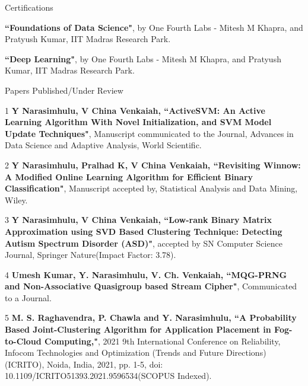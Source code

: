 \documentclass{resume} %
\begin{document}
\pagebreak

\begin{rSection}{Certifications}
	
	\begin{rSubsection}{}{}{}{}
		\item \textbf{``Foundations of Data Science"},  by One Fourth Labs - Mitesh M Khapra, and Pratyush Kumar, IIT Madras Research Park.
		\item \textbf{``Deep Learning"}, by One Fourth Labs - Mitesh M Khapra, and Pratyush Kumar, IIT Madras Research Park.
		
	\end{rSubsection}
	
\end{rSection}




\begin{rSection}{Papers Published/Under Review}
	
	\begin{rSubsection}{}{}{}{}
		
		\item[1] \textbf{Y Narasimhulu, V China Venkaiah, ``ActiveSVM: An Active Learning Algorithm With Novel Initialization, and SVM Model Update Techniques"}, Manuscript communicated to the Journal, Advances in Data Science and Adaptive Analysis, World Scientific. 
		
		\item[2] \textbf{Y Narasimhulu, Pralhad K, V China Venkaiah, ``Revisiting Winnow: A Modified Online Learning Algorithm for Efficient Binary Classification"}, Manuscript accepted by, Statistical Analysis and Data Mining, Wiley.
		
		\item[3] \textbf{Y Narasimhulu, V China Venkaiah, ``Low-rank Binary Matrix Approximation using SVD Based Clustering Technique: Detecting Autism Spectrum Disorder (ASD)"}, accepted by SN Computer Science Journal, Springer Nature(Impact Factor: 3.78).
		
		\item[4] \textbf{Umesh Kumar, Y. Narasimhulu, V. Ch. Venkaiah, ``MQG-PRNG and Non-Associative Quasigroup based Stream Cipher"}, Communicated to a Journal.
		
		\item[5] \textbf{M. S. Raghavendra, P. Chawla and Y. Narasimhulu, ``A Probability Based Joint-Clustering Algorithm for Application Placement in Fog-to-Cloud Computing,"}, 2021 9th International Conference on Reliability, Infocom Technologies and Optimization (Trends and Future Directions) (ICRITO), Noida, India, 2021, pp. 1-5, doi: 10.1109/ICRITO51393.2021.9596534(SCOPUS Indexed).
		

\end{rSubsection}
\end{rSection}
\end{document}
